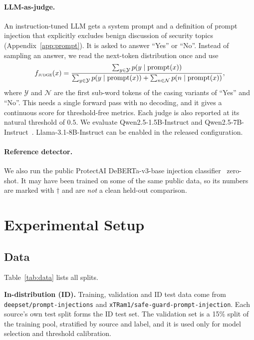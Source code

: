\documentclass[11pt]{article}
\begin{document}
\paragraph{LLM-as-judge.} An instruction-tuned LLM gets a system prompt and a definition
of prompt injection that explicitly excludes benign discussion of security topics
(Appendix~\ref{app:prompt}). It is asked to answer ``Yes'' or ``No''. Instead of sampling
an answer, we read the next-token distribution once and use
\begin{equation}
  f_{\textsc{judge}}(x)=\frac{\sum_{y\in\mathcal{Y}}p(y\mid\text{prompt}(x))}{\sum_{y\in\mathcal{Y}}p(y\mid\text{prompt}(x))+\sum_{n\in\mathcal{N}}p(n\mid\text{prompt}(x))},
\end{equation}
where $\mathcal{Y}$ and $\mathcal{N}$ are the first sub-word tokens of the casing variants
of ``Yes'' and ``No''. This needs a single forward pass with no decoding, and it gives a
continuous score for threshold-free metrics. Each judge is also reported at its natural
threshold of $0.5$. We evaluate Qwen2.5-1.5B-Instruct and Qwen2.5-7B-Instruct~\citep{qwen2025qwen25}.
Llama-3.1-8B-Instruct can be enabled in the released configuration.

\paragraph{Reference detector.} We also run the public ProtectAI
DeBERTa-v3-base injection classifier~\citep{protectai2024deberta} zero-shot. It may have
been trained on some of the same public data, so its numbers are marked with
$\dagger$ and are \emph{not} a clean held-out comparison.

\section{Experimental Setup}
\label{sec:setup}

\subsection{Data}
\label{sec:data}

Table~\ref{tab:data} lists all splits.

\textbf{In-distribution (ID).} Training, validation and ID test data come from
\texttt{deepset/prompt-injections} and \texttt{xTRam1/safe-guard-prompt-injection}. Each
source's own test split forms the ID test set. The validation set is a 15\% split of the
training pool, stratified by source and label, and it is used only for model selection and
threshold calibration.
\end{document}
